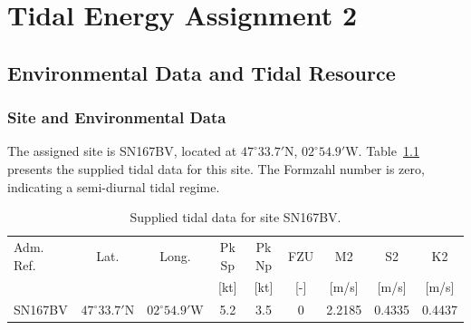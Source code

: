 \chapter{Tidal Energy Assignment 2}
\label{ch:tidal}


\section{Environmental Data and Tidal Resource}
\label{sec:tidal-resource}

\subsection{Site and Environmental Data}
\label{sec:tidal-site}
The assigned site is SN167BV, located at
$47^\circ 33.7'\mathrm{N}$, $02^\circ 54.9'\mathrm{W}$.
Table~\ref{tab:tidal-site} presents the supplied tidal data
for this site. The Formzahl number is zero, indicating
a semi-diurnal tidal regime.

\begin{table}[H]
    \centering
    \caption{Supplied tidal data for site SN167BV.}
    \label{tab:tidal-site}
    \small
    \setlength{\tabcolsep}{4pt}
    \begin{tabular}{lcccccccc}
        \hline
        Adm. Ref. & Lat. & Long. & Pk Sp & Pk Np & FZU
        & M2 & S2 & K2 \\
        & & & [kt] & [kt] & [-]
        & [m/s] & [m/s] & [m/s] \\
        \hline
        SN167BV & $47^\circ 33.7'\mathrm{N}$
        & $02^\circ 54.9'\mathrm{W}$
        & 5.2 & 3.5 & 0 & 2.2185 & 0.4335 & 0.4437 \\
        \hline
    \end{tabular}
\end{table}



